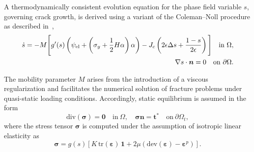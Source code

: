 \documentclass[pdflatex,sn-mathphys-num]{sn-jnl}%
\theoremstyle{thmstyleone}%
\theoremstyle{thmstyletwo}%
\theoremstyle{thmstylethree}%
\begin{document}

A thermodynamically consistent evolution equation for the phase field variable $s$, governing crack growth, is derived using a variant of the Coleman--Noll procedure as described in~\cite{noll_3d_2020},
\begin{align}
    \begin{split}
    \dot{s} = -M \Bigg[
    g'(s)\left(\psi_{\rm{el}} + \left(\sigma_y+\dfrac{1}{2}H\alpha\right)\alpha\right)
    - J_c\left(2\epsilon\Delta{s} + \dfrac{1-s}{2\epsilon}\right)
    \Bigg]
    \quad \text{in} \ \Omega, \\
    \nabla{s}\cdot{\boldsymbol{n}} = 0 \quad \text{on} \ \partial\Omega.
    \label{eq:evolution_s}
    \end{split}
\end{align}

The mobility parameter $M$ arises from the introduction of a viscous regularization and facilitates the numerical solution of fracture problems under quasi-static loading conditions. 
Accordingly, static equilibrium is assumed in the form
\begin{equation}
    \text{div}(\boldsymbol{\sigma}) = \boldsymbol{0} \quad \text{in} \ \Omega, 
    \quad 
    \boldsymbol{\sigma}\boldsymbol{n} = \boldsymbol{t}^* 
    \quad \text{on} \ \partial\Omega_t,
    \label{eq:equilibrium}
\end{equation}
where the stress tensor $\boldsymbol{\sigma}$ is computed under the assumption of isotropic linear elasticity as
\begin{equation}
    \boldsymbol{\sigma} = g(s)\left[
    K\,\text{tr}(\boldsymbol{\varepsilon})\,\boldsymbol{1}
    + 2\mu\left(\text{dev}(\boldsymbol{\varepsilon}) - \boldsymbol{\varepsilon}^p\right)
    \right].
    \label{eq:sigma_plast}
\end{equation}
\end{document}
